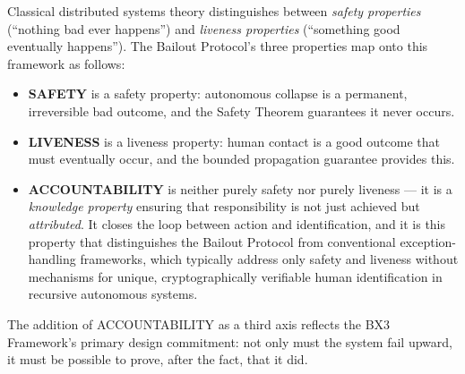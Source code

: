 Classical distributed systems theory distinguishes between \emph{safety properties} (``nothing bad ever happens'') and \emph{liveness properties} (``something good eventually happens''). The Bailout Protocol's three properties map onto this framework as follows:

\begin{itemize}
  \item \textbf{SAFETY} is a safety property: autonomous collapse is a permanent, irreversible bad outcome, and the Safety Theorem guarantees it never occurs.
  \item \textbf{LIVENESS} is a liveness property: human contact is a good outcome that must eventually occur, and the bounded propagation guarantee provides this.
  \item \textbf{ACCOUNTABILITY} is neither purely safety nor purely liveness — it is a \emph{knowledge property} ensuring that responsibility is not just achieved but \emph{attributed}. It closes the loop between action and identification, and it is this property that distinguishes the Bailout Protocol from conventional exception-handling frameworks, which typically address only safety and liveness without mechanisms for unique, cryptographically verifiable human identification in recursive autonomous systems.
\end{itemize}

The addition of ACCOUNTABILITY as a third axis reflects the BX3 Framework's primary design commitment: not only must the system fail upward, it must be possible to prove, after the fact, that it did.
